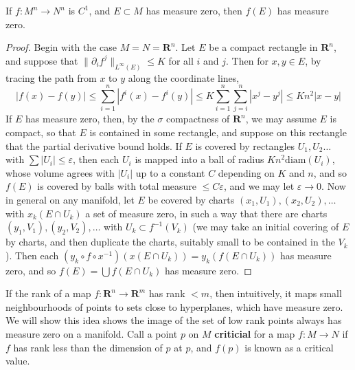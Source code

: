 \begin{lemma}
    If $f: M^n \to N^n$ is $C^1$, and $E \subset M$ has measure zero, then $f(E)$ has measure zero.
\end{lemma}
\begin{proof}
    Begin with the case $M = N = \mathbf{R}^n$. Let $E$ be a compact rectangle in $\mathbf{R}^n$, and suppose that $\| \partial_i f^j \|_{L^\infty(E)} \leq K$ for all $i$ and $j$. Then for $x,y \in E$, by tracing the path from $x$ to $y$ along the coordinate lines,
    \[ |f(x) - f(y)| \leq \sum_{i = 1}^n |f^i(x) - f^i(y)| \leq K \sum_{i = 1}^n \sum_{j = i}^n |x^j - y^j| \leq Kn^2 |x-y| \]
    If $E$ has measure zero, then, by the $\sigma$ compactness of $\mathbf{R}^n$, we may assume $E$ is compact, so that $E$ is contained in some rectangle, and suppose on this rectangle that the partial derivative bound holds. If $E$ is covered by rectangles $U_1, U_2 \dots$ with $\sum |U_i| \leq \varepsilon$, then each $U_i$ is mapped into a ball of radius $Kn^2 \text{diam}(U_i)$, whose volume agrees with $|U_i|$ up to a constant $C$ depending on $K$ and $n$, and so $f(E)$ is covered by balls with total measure $\leq C\varepsilon$, and we may let $\varepsilon \to 0$. Now in general on any manifold, let $E$ be covered by charts $(x_1,U_1), (x_2,U_2), \dots$ with $x_k(E \cap U_k)$ a set of measure zero, in such a way that there are charts $(y_1,V_1), (y_2,V_2), \dots$ with $U_k \subset f^{-1}(V_k)$ (we may take an initial covering of $E$ by charts, and then duplicate the charts, suitably small to be contained in the $V_k$). Then each $(y_k \circ f \circ x^{-1})(x(E \cap U_k)) = y_k(f(E \cap U_k))$ has measure zero, and so $f(E) = \bigcup f(E \cap U_k)$ has measure zero.
\end{proof}

If the rank of a map $f: \mathbf{R}^n \to \mathbf{R}^m$ has rank $< m$, then intuitively, it maps small neighbourhoods of points to sets close to hyperplanes, which have measure zero. We will show this idea shows the image of the set of low rank points always has measure zero on a manifold. Call a point $p$ on $M$ {\bf criticial} for a map $f:M \to N$ if $f$ has rank less than the dimension of $p$ at $p$, and $f(p)$ is known as a critical value.

